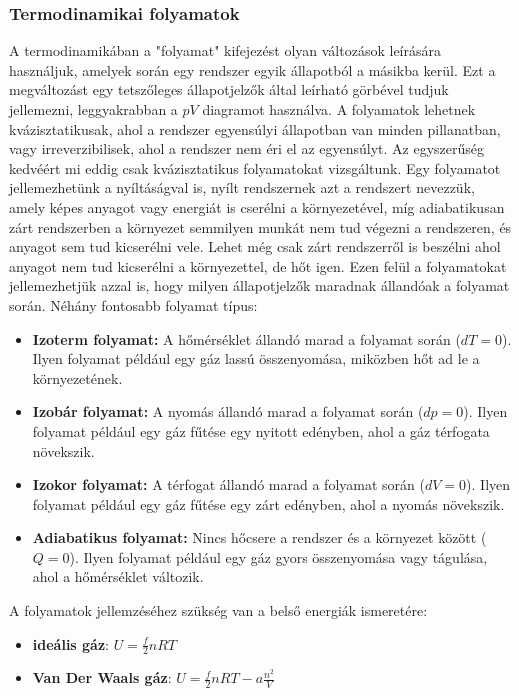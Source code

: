 \documentclass[../main.tex]{subfiles}
\begin{document}
\subsubsection{Termodinamikai folyamatok}
A termodinamikában a "folyamat" kifejezést olyan változások leírására használjuk, amelyek során egy rendszer egyik állapotból a másikba kerül. Ezt a megváltozást
egy tetszőleges állapotjelzők által leírható görbével tudjuk jellemezni, leggyakrabban a $pV$ diagramot használva. A folyamatok lehetnek kvázisztatikusak, ahol a rendszer egyensúlyi állapotban van minden pillanatban, vagy irreverzibilisek, ahol a rendszer nem éri el az egyensúlyt.
Az egyszerűség kedvéért mi eddig csak kvázisztatikus folyamatokat vizsgáltunk. Egy folyamatot jellemezhetünk a nyíltáságval is, nyílt rendszernek azt a rendszert nevezzük, amely képes anyagot vagy energiát is cserélni a környezetével, míg adiabatikusan zárt rendszerben a környezet semmilyen munkát nem tud végezni a rendszeren, és anyagot sem tud kicserélni vele.
Lehet még csak zárt rendszerről is beszélni ahol anyagot nem tud kicserélni a környezettel, de hőt igen.
Ezen felül a folyamatokat jellemezhetjük azzal is, hogy milyen állapotjelzők maradnak állandóak a folyamat során. Néhány fontosabb folyamat típus:
\begin{itemize}
    \item \textbf{Izoterm folyamat:} A hőmérséklet állandó marad a folyamat során ($dT = 0$). Ilyen folyamat például egy gáz lassú összenyomása, miközben hőt ad le a környezetének.
    \item \textbf{Izobár folyamat:} A nyomás állandó marad a folyamat során ($dp = 0$). Ilyen folyamat például egy gáz fűtése egy nyitott edényben, ahol a gáz térfogata növekszik.
    \item \textbf{Izokor folyamat:} A térfogat állandó marad a folyamat során ($dV = 0$). Ilyen folyamat például egy gáz fűtése egy zárt edényben, ahol a nyomás növekszik.
    \item \textbf{Adiabatikus folyamat:} Nincs hőcsere a rendszer és a környezet között ($Q = 0$). Ilyen folyamat például egy gáz gyors összenyomása vagy tágulása, ahol a hőmérséklet változik.
\end{itemize}
A folyamatok jellemzéséhez szükség van a belső energiák ismeretére:
\begin{itemize}
    \item \textbf{ideális gáz}: $U = \frac{f}{2} n R T$
    \item \textbf{Van Der Waals gáz}: $U = \frac{f}{2} n R T - a \frac{n^2}{V}$
\end{itemize}
\end{document}
